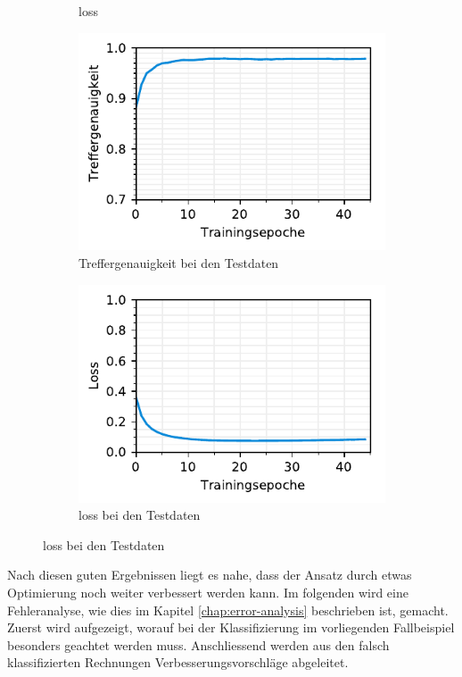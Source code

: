 \begin{figure}[h!]
\begin{subfigure}[b]{0.5\linewidth}
    \caption{loss} 
    \label{text-class-results:loss} 
    \vspace{2ex}
  \end{subfigure} 
  \begin{subfigure}[b]{0.5\linewidth}
    \centering
    \includegraphics[scale=1]{graphics/matplot/textual-class__val_acc.pdf} 
    \caption{Treffergenauigkeit bei den Testdaten} 
    \label{text-class-results:val_acc} 
  \end{subfigure}%
  \begin{subfigure}[b]{0.5\linewidth}
    \centering
    \includegraphics[scale=1]{graphics/matplot/textual-class__val_loss.pdf} 
    \caption{loss bei den Testdaten} 
    \label{text-class-results:val_loss} 
  \end{subfigure}
  \centering
\end{figure}

Nach diesen guten Ergebnissen liegt es nahe, dass der Ansatz durch etwas Optimierung noch weiter verbessert werden kann. Im folgenden wird eine Fehleranalyse, wie dies im Kapitel \ref{chap:error-analysis} beschrieben ist, gemacht. Zuerst wird aufgezeigt, worauf bei der Klassifizierung im vorliegenden Fallbeispiel besonders geachtet werden muss. Anschliessend werden aus den falsch klassifizierten Rechnungen Verbesserungsvorschläge abgeleitet. 

